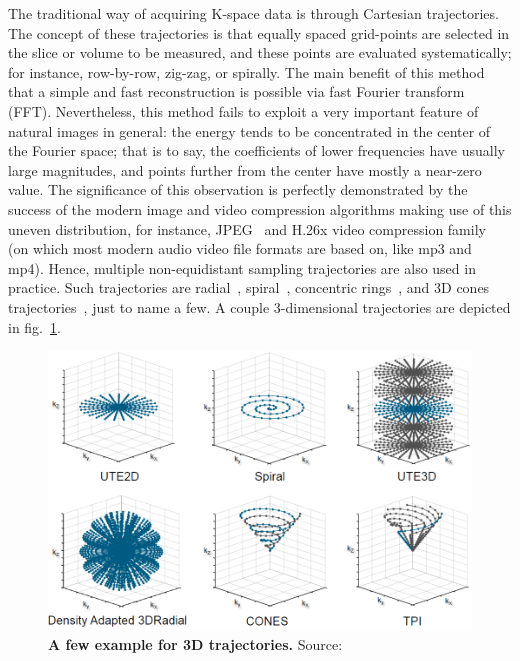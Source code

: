 The traditional way of acquiring K-space data is through Cartesian trajectories. The concept of these trajectories is that equally spaced grid-points are selected in the slice or volume to be measured, and these points are evaluated systematically; for instance, row-by-row, zig-zag, or spirally. The main benefit of this method that a simple and fast reconstruction is possible via fast Fourier transform (FFT). Nevertheless, this method fails to exploit a very important feature of natural images in general: the energy tends to be concentrated in the center of the Fourier space; that is to say, the coefficients of lower frequencies have usually large magnitudes, and points further from the center have mostly a near-zero value. The significance of this observation is perfectly demonstrated by the success of the modern image and video compression algorithms making use of this uneven distribution, for instance, JPEG~\cite{wallace_jpeg_1992} and H.26x video compression family~\cite{farooq_study_2017} (on which most modern audio video file formats are based on, like mp3 and mp4). Hence, multiple non-equidistant sampling trajectories are also used in practice. Such trajectories are radial~\cite{rasche_continuous_1995}, spiral~\cite{blum_fast_1987}, concentric rings~\cite{wu_mri_2008}, and 3D cones trajectories~\cite{gurney_design_2006}, just to name a few. A couple 3-dimensional trajectories are depicted in fig.~\ref{fig:trajectories}.

\begin{figure}[tb]
    \centering
    \includegraphics[width=0.8\linewidth]{images/trajectories.png}
    \caption{\textbf{A few example for 3D trajectories.} Source:~\cite{noauthor_forschungszentrum_nodate}}
    \label{fig:trajectories}
\end{figure}

